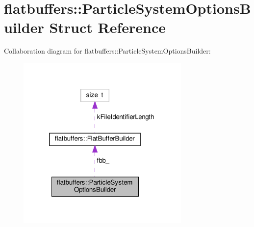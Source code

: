 \hypertarget{structflatbuffers_1_1ParticleSystemOptionsBuilder}{}\section{flatbuffers\+:\+:Particle\+System\+Options\+Builder Struct Reference}
\label{structflatbuffers_1_1ParticleSystemOptionsBuilder}


Collaboration diagram for flatbuffers\+:\+:Particle\+System\+Options\+Builder\+:
\nopagebreak
\begin{figure}[H]
\begin{center}
\leavevmode
\includegraphics[width=241pt]{structflatbuffers_1_1ParticleSystemOptionsBuilder__coll__graph}
\end{center}
\end{figure}

